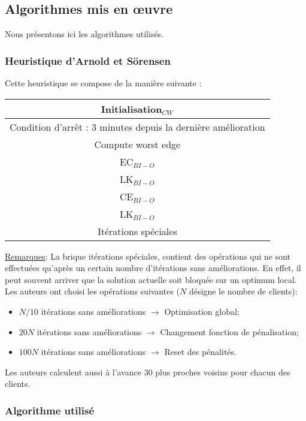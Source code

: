 \documentclass[a4paper,11pt]{article}%
\begin{document}
\subsection{Algorithmes mis en œuvre}
Nous présentons ici les algorithmes utilisés.
\subsubsection{Heuristique d'Arnold et Sörensen}

Cette heuristique se compose de la manière suivante :


\begin{center}
\begin{tabular}{|c|}

   \hline
   Initialisation$_{CW}$  \\
   \hline
   \hline
   Condition d'arrêt : 3 minutes depuis la dernière amélioration  \\
   \hline
   Compute worst edge \\
   \hline
   EC$_{BI-O}$ \\
   \hline
   LK$_{BI-O}$ \\
   \hline
   CE$_{BI-O}$ \\
   \hline
   LK$_{BI-O}$ \\
   \hline
   Itérations spéciales \\
   \hline
   \hline
   
\end{tabular}
\end{center}

\underline{Remarques}: La brique itérations spéciales, contient des opérations qui ne sont effectuées qu'après un certain nombre d'itérations sans améliorations. En effet, il peut souvent arriver que la solution actuelle soit bloquée sur un optimum local. Les auteurs ont choisi les opérations suivantes ($N$ désigne le nombre de clients):
\begin{itemize}
\item $N/10$ itérations sans améliorations $\rightarrow$ Optimisation global;
\item $20N$ itérations sans améliorations $\rightarrow$ Changement fonction de pénalisation;
\item $100N$ itérations sans améliorations $\rightarrow$ Reset des pénalités.
\end{itemize} 

Les auteurs calculent aussi à l'avance $30$ plus proches voisins pour chacun des clients.

\subsubsection{Algorithme utilisé}
\end{document}
